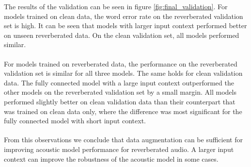 The results of the validation can be seen in figure \ref{fig:final_validation}. For models trained on clean data, the word error rate on the reverberated validation set is high. It can be seen that models with larger input context performed better on unseen reverberated data. On the clean validation set, all models performed similar. \\ \\
For models trained on reverberated data, the performance on the reverberated validation set is similar for all three models. The same holds for clean validation data. The fully connected model with a large input context outperformed the other models on the reverberated validation set by a small margin. All models performed slightly better on clean validation data than their counterpart that was trained on clean data only, where the difference was most significant for the fully connected model with short input context. \\ \\
From this observations we conclude that data augmentation can be sufficient for improving acoustic model performance for reverberated audio. A larger input context can improve the robustness of the acoustic model in some cases. 
\iffalse
TODO: Describe how we generated reverbed data
TODO: Describe how we tested on reverbed data
TODO: Describe final architecture and results

This chapter should summarize and interpret the results. It should give a clear insight
about which methods did decrease the FER and WER on reverbed and unreverbed data, respectivley.
\fi